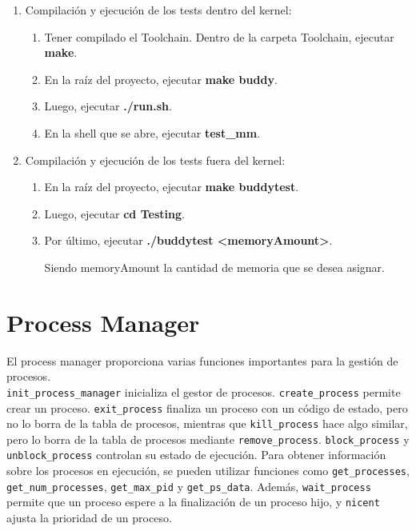 \documentclass{article}
\begin{document}
\begin{enumerate}

\item Compilación y ejecución de los tests dentro del kernel:

\begin{enumerate}
    \item Tener compilado el Toolchain. Dentro de la carpeta Toolchain, ejecutar \textbf{make}.
    \item En la raíz del proyecto, ejecutar \textbf{make buddy}.
    \item Luego, ejecutar \textbf{./run.sh}.
    \item En la shell que se abre, ejecutar \textbf{test\_mm}.
\end{enumerate}

\item Compilación y ejecución de los tests fuera del kernel:

\begin{enumerate}
    \item En la raíz del proyecto, ejecutar \textbf{make buddytest}.
    \item Luego, ejecutar \textbf{cd Testing}.
    \item Por último, ejecutar \textbf{./buddytest \textless memoryAmount\textgreater}.

    Siendo memoryAmount la cantidad de memoria que se desea asignar.
\end{enumerate}
\end{enumerate}

\section {Process Manager}
El process manager proporciona varias funciones importantes para la gestión de procesos. \\
\texttt{init\_process\_manager} inicializa el gestor de procesos. \texttt{create\_process} permite crear un proceso. \texttt{exit\_process} finaliza un proceso con un código de estado, pero no lo borra de la tabla de procesos, mientras que \texttt{kill\_process} hace algo similar, pero lo borra de la tabla de procesos mediante \texttt{remove\_process}. \texttt{block\_process} y \texttt{unblock\_process} controlan su estado de ejecución. Para obtener información sobre los procesos en ejecución, se pueden utilizar funciones como \texttt{get\_processes}, \texttt{get\_num\_processes}, \texttt{get\_max\_pid} y \texttt{get\_ps\_data}. Además, \texttt{wait\_process} permite que un proceso espere a la finalización de un proceso hijo, y \texttt{nicent} ajusta la prioridad de un proceso.
\end{document}
